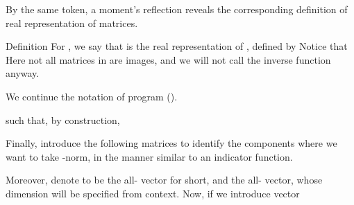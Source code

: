 By the same token, a moment's reflection reveals the corresponding definition of real representation of matrices.

\Result
{Definition}
{
For , we say that  is the real representation of , defined by
Notice that Here not all matrices in  are images, and we will not call the inverse function anyway.
}

We continue the notation of program ().

such that, by construction,

Finally, introduce the following matrices to identify the components where we want to take -norm, in the manner similar to an indicator function.

Moreover, denote  to be the all- vector for short, and  the all- vector, whose dimension will be specified from context.
Now, if we introduce vector 

